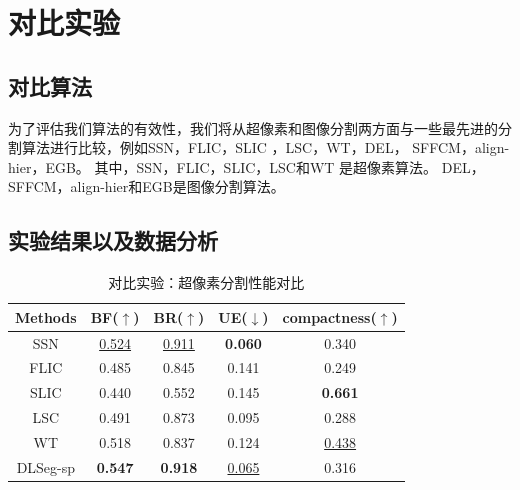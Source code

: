 \section{对比实验}

\subsection{对比算法}

为了评估我们算法的有效性，我们将从超像素和图像分割两方面与一些最先进的分割算法进行比较，例如SSN\cite{jampani2018superpixel}，FLIC\cite{Zhao2017FLIC}，SLIC \cite{achanta2012slic}，LSC\cite{li2015superpixel}，WT\cite{Hu2015Watershed}，DEL\cite{liu2018deep}，
SFFCM\cite{lei2018superpixel}，align-hier\cite{chen2016scale}，EGB\cite{felzenszwalb2004efficient}。 其中，SSN，FLIC，SLIC，LSC和WT 是超像素算法。 DEL，SFFCM，align-hier和EGB是图像分割算法。

\subsection{实验结果以及数据分析}

\begin{table}[htbp]
\caption{对比实验：超像素分割性能对比}
\label{tab4}
\vspace{0.5em}\centering\wuhao
\begin{tabular}{ccccc}
\toprule[1.5pt]
Methods & BF($\uparrow$) & BR($\uparrow$) & UE($\downarrow$) & compactness($\uparrow$) \\
\midrule[1pt]
SSN     & \underline{0.524} & \underline{0.911} & \textbf{0.060}    & 0.340 \\
FLIC    & 0.485             & 0.845             & 0.141             & 0.249\\
SLIC    & 0.440             & 0.552             & 0.145             & \textbf{0.661}\\
LSC     & 0.491             & 0.873             & 0.095             & 0.288\\
WT      & 0.518             & 0.837             & 0.124             & \underline{0.438} \\
DLSeg-sp & \textbf{0.547}    & \textbf{0.918}    & \underline{0.065} & 0.316\\
\bottomrule[1.5pt]
\end{tabular}
\end{table}


